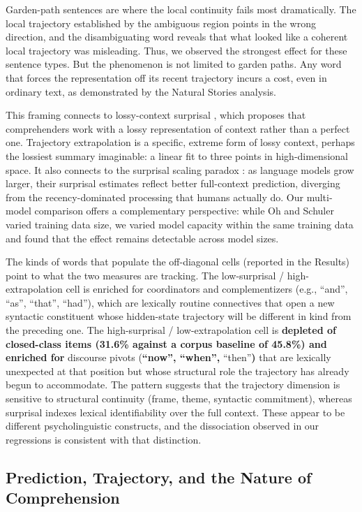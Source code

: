 \documentclass[12pt]{article}
\newcommand{\new}[1]{{\bfseries #1}}
\begin{document}
Garden-path sentences are where the local continuity fails most dramatically. The local trajectory established by the ambiguous region points in the wrong direction, and the disambiguating word reveals that what looked like a coherent local trajectory was misleading. Thus, we observed the strongest effect for these sentence types. But the phenomenon is not limited to garden paths. Any word that forces the representation off its recent trajectory incurs a cost, even in ordinary text, as demonstrated by the Natural Stories analysis.

This framing connects to lossy-context surprisal \citep{futrell2020}, which proposes that comprehenders work with a lossy representation of context rather than a perfect one. Trajectory extrapolation is a specific, extreme form of lossy context, perhaps the lossiest summary imaginable: a linear fit to three points in high-dimensional space. It also connects to the surprisal scaling paradox \citep{oh2023b}: as language models grow larger, their surprisal estimates reflect better full-context prediction, diverging from the recency-dominated processing that humans actually do. Our multi-model comparison offers a complementary perspective: while Oh and Schuler varied training data size, we varied model capacity within the same training data and found that the effect remains detectable across model sizes.

The kinds of words that populate the off-diagonal cells (reported in the Results) point to what the two measures are tracking. The low-surprisal / high-extrapolation cell is enriched for coordinators and complementizers (e.g., ``and'', ``as'', ``that'', ``had''), which are lexically routine connectives that open a new syntactic constituent whose hidden-state trajectory will be different in kind from the preceding one. The high-surprisal / low-extrapolation cell is \new{depleted of closed-class items (31.6\% against a corpus baseline of 45.8\%) and enriched for} discourse pivots (\new{``now'', ``when'',} ``then''\new{)} that are lexically unexpected at that position but whose structural role the trajectory has already begun to accommodate. The pattern suggests that the trajectory dimension is sensitive to structural continuity (frame, theme, syntactic commitment), whereas surprisal indexes lexical identifiability over the full context. These appear to be different psycholinguistic constructs, and the dissociation observed in our regressions is consistent with that distinction.

\subsection{Prediction, Trajectory, and the Nature of Comprehension}
\end{document}
